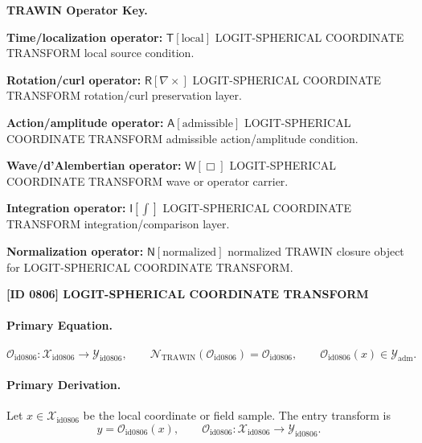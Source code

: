 \par\vspace{0.45\baselineskip}
\noindent\begin{minipage}[t]{\linewidth}
\begingroup
\small
\raggedright
\textbf{TRAWIN Operator Key.}\par
\noindent\textbf{Time/localization operator:} $\mathsf{T}\!\left[\mathrm{local}\right]$ LOGIT-SPHERICAL COORDINATE TRANSFORM local source condition.\par
\noindent\textbf{Rotation/curl operator:} $\mathsf{R}\!\left[\nabla\times\right]$ LOGIT-SPHERICAL COORDINATE TRANSFORM rotation/curl preservation layer.\par
\noindent\textbf{Action/amplitude operator:} $\mathsf{A}\!\left[\mathrm{admissible}\right]$ LOGIT-SPHERICAL COORDINATE TRANSFORM admissible action/amplitude condition.\par
\noindent\textbf{Wave/d'Alembertian operator:} $\mathsf{W}\!\left[\Box\right]$ LOGIT-SPHERICAL COORDINATE TRANSFORM wave or operator carrier.\par
\noindent\textbf{Integration operator:} $\mathsf{I}\!\left[\int\right]$ LOGIT-SPHERICAL COORDINATE TRANSFORM integration/comparison layer.\par
\noindent\textbf{Normalization operator:} $\mathsf{N}\!\left[\mathrm{normalized}\right]$ normalized TRAWIN closure object for LOGIT-SPHERICAL COORDINATE TRANSFORM.\par
\endgroup
\end{minipage}

\clearpage
\noindent\textbf{[ID 0806] LOGIT-SPHERICAL COORDINATE TRANSFORM}\par
\vspace{0.35em}
\paragraph{Primary Equation.}
\[
\mathcal{O}_{\mathrm{id0806}}:\mathcal{X}_{\mathrm{id0806}}\longrightarrow \mathcal{Y}_{\mathrm{id0806}},\qquad
\mathcal{N}_{\mathrm{TRAWIN}}(\mathcal{O}_{\mathrm{id0806}})=\mathcal{O}_{\mathrm{id0806}},\qquad
\mathcal{O}_{\mathrm{id0806}}(x)\in\mathcal{Y}_{\mathrm{adm}}.
\]

\paragraph{Primary Derivation.} Let $x\in \mathcal{X}_{\mathrm{id0806}}$ be the local coordinate or field sample.  The entry transform is\[
y=\mathcal{O}_{\mathrm{id0806}}(x),\qquad \mathcal{O}_{\mathrm{id0806}}:\mathcal{X}_{\mathrm{id0806}}\longrightarrow \mathcal{Y}_{\mathrm{id0806}}.
\]


